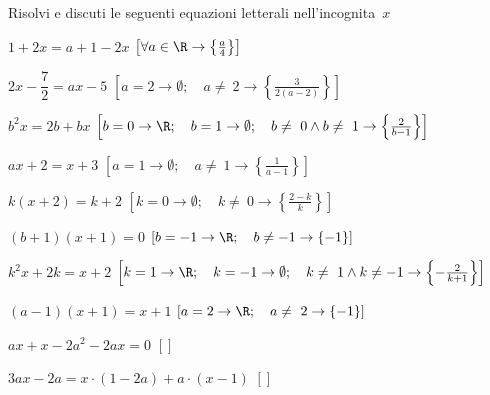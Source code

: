 \subsubsection*{}

\begin{esercizio}[*]
\label{ese:20.34}
Risolvi e discuti le seguenti equazioni letterali nell'incognita~\(x\)
\begin{enumeratea}
 \item \(1+2x=a+1-2x\)
\hfill \(\left[\forall a\in \R \rightarrow \left\{\frac{a}{4}\right\}\right]\)
 \item \(2x-\dfrac{7}{2}=ax-5\)
\hfill \(\left[a=2 \rightarrow \emptyset; \quad a \neq~2 \rightarrow 
              \left\{\frac{3}{2(a-2)}\right\}\right]\)
 \item \(b^{2}x=2b+bx\)
\hfill \(\left[b=0 \rightarrow \R; \quad 
              b=1\rightarrow\emptyset; \quad 
              b\neq~0\wedge b\neq~1\rightarrow \left\{\frac{2}{b-1}\right\}
        \right]\)
 \item \(ax+2=x+3\)
\hfill \(\left[a=1\rightarrow \emptyset; \quad 
              a\neq~1\rightarrow \left\{\frac{1}{a-1}\right\}\right]\)
 \item \(k(x+2)=k+2\)
\hfill \(\left[k=0 \rightarrow \emptyset; \quad k\neq~0 \rightarrow 
\left\{\frac{2-k}{k}\right\}\right]\)
 \item \((b+1)(x+1)=0\)
\hfill \(\left[b=-1 \rightarrow \R; \quad b\neq -1 \rightarrow 
\left\{-1\right\}\right]\)
 \item \(k^{2}x+2k=x+2\)
\hfill \(\left[k=1 \rightarrow \R; \quad k=-1 \rightarrow 
\emptyset; \quad k\neq~1\wedge k\neq -1 \rightarrow 
\left\{-{\frac{2}{k+1}}\right\}\right]\)
 \item \((a-1)(x+1)=x+1\)
\hfill \(\left[a=2 \rightarrow \R; \quad a\neq~2 \rightarrow 
\left\{-1\right\}\right]\)
 \item \(ax+x-2a^{2}-2ax=0\)
  \hfill \(\left[\right]\)
 \item \(3ax-2a=x\cdot (1-2a)+a\cdot (x-1)\)
  \hfill \(\left[\right]\)

\end{enumeratea}
\end{esercizio}
